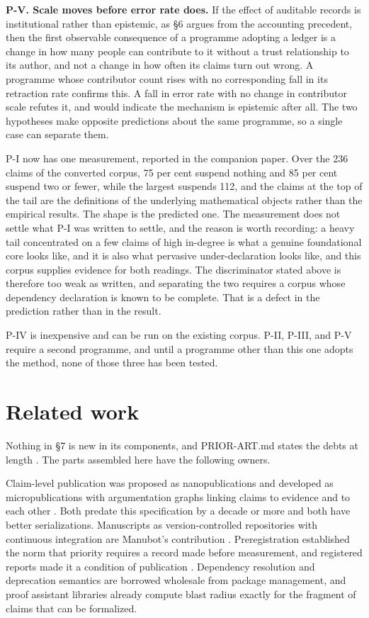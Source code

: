 \documentclass[11pt,letterpaper]{article}
\begin{document}
\textbf{P-V. Scale moves before error rate does.} If the effect of auditable
records is institutional rather than epistemic, as \S6 argues from the accounting
precedent, then the first observable consequence of a programme adopting a ledger
is a change in how many people can contribute to it without a trust relationship
to its author, and not a change in how often its claims turn out wrong. A
programme whose contributor count rises with no corresponding fall in its
retraction rate confirms this. A fall in error rate with no change in
contributor scale refutes it, and would indicate the mechanism is epistemic after
all. The two hypotheses make opposite predictions about the same programme, so a
single case can separate them.

P-I now has one measurement, reported in the companion paper. Over the 236
claims of the converted corpus, 75 per cent suspend nothing and 85 per cent
suspend two or fewer, while the largest suspends 112, and the claims at the top
of the tail are the definitions of the underlying mathematical objects rather
than the empirical results. The shape is the predicted one. The measurement does
not settle what P-I was written to settle, and the reason is worth recording: a
heavy tail concentrated on a few claims of high in-degree is what a genuine
foundational core looks like, and it is also what pervasive under-declaration
looks like, and this corpus supplies evidence for both readings. The
discriminator stated above is therefore too weak as written, and separating the
two requires a corpus whose dependency declaration is known to be complete. That
is a defect in the prediction rather than in the result.

P-IV is inexpensive and can be run on the existing corpus. P-II, P-III, and P-V
require a second programme, and until a programme other than this one adopts the
method, none of those three has been tested.

\section{Related work}

Nothing in \S7 is new in its components, and PRIOR-ART.md states the debts at
length \citep{priorart}. The parts assembled here have the following owners.

Claim-level publication was proposed as nanopublications
\citep{groth2010} and developed as micropublications with argumentation graphs
linking claims to evidence and to each other \citep{clark2014}. Both predate this
specification by a decade or more and both have better serializations.
Manuscripts as version-controlled repositories with continuous integration are
Manubot's contribution \citep{himmelstein2019}. Preregistration established the
norm that priority requires a record made before measurement, and registered
reports made it a condition of publication \citep{chambers2013}. Dependency
resolution and deprecation semantics are borrowed wholesale from package
management, and proof assistant libraries already compute blast radius exactly
for the fragment of claims that can be formalized.
\end{document}
